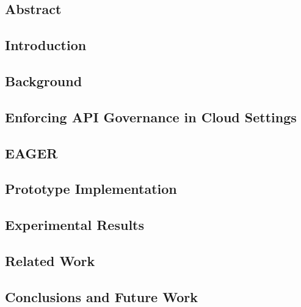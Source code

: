 \subsection{Abstract}


\subsection{Introduction}
\label{sec:eager_intro}


\subsection{Background}
\label{sec:eager_bg}


\subsection{Enforcing API Governance in Cloud Settings}
\label{sec:eager_enforce}


\subsection{EAGER}
\label{sec:eager_eager}


\subsection{Prototype Implementation}
\label{sec:eager_prototype_impl}


\subsection{Experimental Results}
\label{sec:eager_results}


\subsection{Related Work}
\label{sec:eager_related_work}


\subsection{Conclusions and Future Work}
\label{sec:eager_conc}

